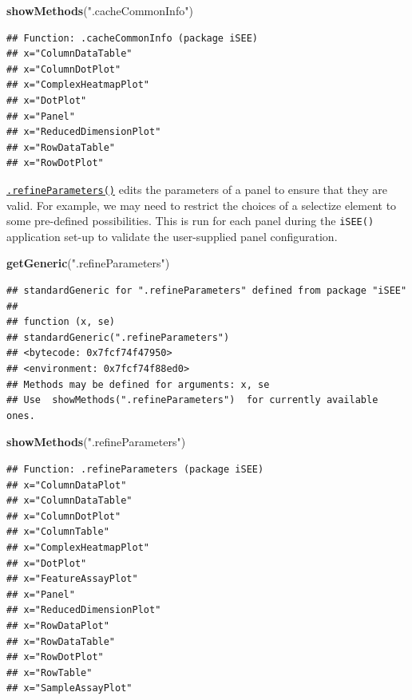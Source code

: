 \documentclass[
]{book}
\newenvironment{Shaded}{\begin{snugshade}}{\end{snugshade}}
\newcommand{\KeywordTok}[1]{\textcolor[rgb]{0.13,0.29,0.53}{\textbf{#1}}}
\newcommand{\NormalTok}[1]{#1}
\newcommand{\StringTok}[1]{\textcolor[rgb]{0.31,0.60,0.02}{#1}}
\begin{document}
\begin{Shaded}
\begin{Highlighting}[]
\KeywordTok{showMethods}\NormalTok{(}\StringTok{".cacheCommonInfo"}\NormalTok{)}
\end{Highlighting}
\end{Shaded}

\begin{verbatim}
## Function: .cacheCommonInfo (package iSEE)
## x="ColumnDataTable"
## x="ColumnDotPlot"
## x="ComplexHeatmapPlot"
## x="DotPlot"
## x="Panel"
## x="ReducedDimensionPlot"
## x="RowDataTable"
## x="RowDotPlot"
\end{verbatim}

\href{https://isee.github.io/iSEE/reference/setup-generics.html}{\texttt{.refineParameters()}} edits the parameters of a panel to ensure that they are valid.
For example, we may need to restrict the choices of a selectize element to some pre-defined possibilities.
This is run for each panel during the \texttt{iSEE()} application set-up to validate the user-supplied panel configuration.

\begin{Shaded}
\begin{Highlighting}[]
\KeywordTok{getGeneric}\NormalTok{(}\StringTok{".refineParameters"}\NormalTok{)}
\end{Highlighting}
\end{Shaded}

\begin{verbatim}
## standardGeneric for ".refineParameters" defined from package "iSEE"
## 
## function (x, se) 
## standardGeneric(".refineParameters")
## <bytecode: 0x7fcf74f47950>
## <environment: 0x7fcf74f88ed0>
## Methods may be defined for arguments: x, se
## Use  showMethods(".refineParameters")  for currently available ones.
\end{verbatim}

\begin{Shaded}
\begin{Highlighting}[]
\KeywordTok{showMethods}\NormalTok{(}\StringTok{".refineParameters"}\NormalTok{)}
\end{Highlighting}
\end{Shaded}

\begin{verbatim}
## Function: .refineParameters (package iSEE)
## x="ColumnDataPlot"
## x="ColumnDataTable"
## x="ColumnDotPlot"
## x="ColumnTable"
## x="ComplexHeatmapPlot"
## x="DotPlot"
## x="FeatureAssayPlot"
## x="Panel"
## x="ReducedDimensionPlot"
## x="RowDataPlot"
## x="RowDataTable"
## x="RowDotPlot"
## x="RowTable"
## x="SampleAssayPlot"
\end{verbatim}
\end{document}
